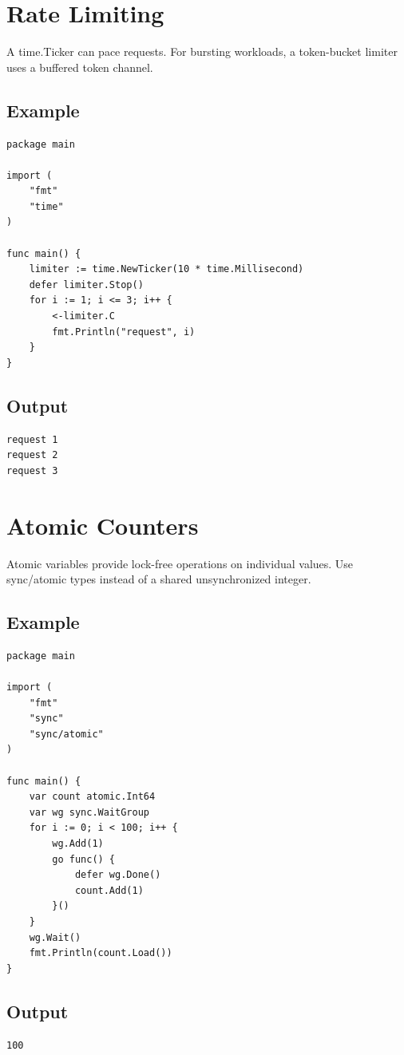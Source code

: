 \documentclass[10pt,oneside]{article}
\newcommand{\sectionline}{\par\vspace{4pt}{\color{rule}\hrule height .5pt}\vspace{7pt}\color{ink}\noindent}
\begin{document}
\section{Rate Limiting}
\sectionline
A time.Ticker can pace requests. For bursting workloads, a token-bucket limiter uses a buffered token channel.\par
\subsection*{Example}
\begin{lstlisting}[style=gocode]
package main

import (
	"fmt"
	"time"
)

func main() {
	limiter := time.NewTicker(10 * time.Millisecond)
	defer limiter.Stop()
	for i := 1; i <= 3; i++ {
		<-limiter.C
		fmt.Println("request", i)
	}
}
\end{lstlisting}
\subsection*{Output}
\begin{lstlisting}[style=terminal]
request 1
request 2
request 3
\end{lstlisting}
\clearpage
\section{Atomic Counters}
\sectionline
Atomic variables provide lock-free operations on individual values. Use sync/atomic types instead of a shared unsynchronized integer.\par
\subsection*{Example}
\begin{lstlisting}[style=gocode]
package main

import (
	"fmt"
	"sync"
	"sync/atomic"
)

func main() {
	var count atomic.Int64
	var wg sync.WaitGroup
	for i := 0; i < 100; i++ {
		wg.Add(1)
		go func() {
			defer wg.Done()
			count.Add(1)
		}()
	}
	wg.Wait()
	fmt.Println(count.Load())
}
\end{lstlisting}
\subsection*{Output}
\begin{lstlisting}[style=terminal]
100
\end{lstlisting}
\clearpage
\end{document}
